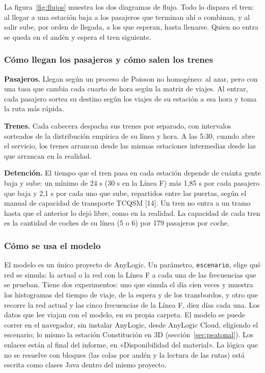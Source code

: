 \documentclass{article}
\begin{document}
La figura~\ref{fig:flujos} muestra los dos diagramas de flujo. Todo lo dispara el tren: al llegar a una
estación baja a los pasajeros que terminan ahí o combinan, y al salir sube, por orden de llegada, a los que
esperan, hasta llenarse. Quien no entra se queda en el andén y espera el tren siguiente.

\subsubsection{Cómo llegan los pasajeros y cómo salen los trenes}

\textbf{Pasajeros.} Llegan según un proceso de Poisson no homogéneo: al azar, pero con una tasa que cambia
cada cuarto de hora según la matriz de viajes. Al entrar, cada pasajero sortea su destino según los viajes
de su estación a esa hora y toma la ruta más rápida.

\textbf{Trenes.} Cada cabecera despacha sus trenes por separado, con intervalos sorteados de la
distribución empírica de su línea y hora. A las 5:30, cuando abre el servicio, los trenes arrancan desde las
mismas estaciones intermedias desde las que arrancan en la realidad.

\textbf{Detención.} El tiempo que el tren pasa en cada estación depende de cuánta gente baja y sube: un
mínimo de 24 s (30 s en la Línea F) más 1,85 s por cada pasajero que baja y 2,1 s por cada uno que sube,
repartidos entre las puertas, según el manual de capacidad de transporte TCQSM [14]. Un tren no entra a un
tramo hasta que el anterior lo dejó libre, como en la realidad. La capacidad de cada tren es la cantidad de
coches de su línea (5 o 6) por 179 pasajeros por coche.

\subsubsection{Cómo se usa el modelo}

El modelo es un único proyecto de AnyLogic. Un parámetro, \texttt{escenario}, elige qué red se simula: la
actual o la red con la Línea F a cada una de las frecuencias que se prueban. Tiene dos experimentos: uno que
simula el día cien veces y muestra los histogramas del tiempo de viaje, de la espera y de los transbordos, y
otro que recorre la red actual y las cinco frecuencias de la Línea F, diez días cada una. Los datos que lee
viajan con el modelo, en su propia carpeta. El modelo se puede correr en el navegador, sin instalar AnyLogic,
desde AnyLogic Cloud, eligiendo el escenario; lo mismo la estación Constitución en 3D
(sección~\ref{sec:peatonal}). Los enlaces están al final del informe, en «Disponibilidad del material». La lógica que no se resuelve con bloques (las colas por andén
y la lectura de las rutas) está escrita como clases Java dentro del mismo proyecto.
\end{document}
